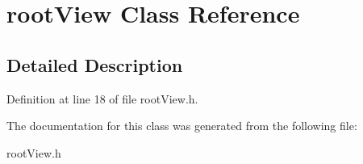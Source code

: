\hypertarget{interfaceroot_view}{
\section{rootView Class Reference}
\label{interfaceroot_view}
}


\subsection{Detailed Description}


Definition at line 18 of file rootView.h.



The documentation for this class was generated from the following file:\begin{DoxyCompactItemize}
\item 
rootView.h\end{DoxyCompactItemize}
